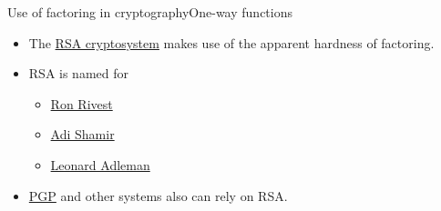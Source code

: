 \begin{frame}{Use of factoring in cryptography}{One-way functions}

\BigSkip{}%
\begin{itemize}
    \item<8-> The \href{https://en.wikipedia.org/wiki/RSA\_(cryptosystem)}{RSA  cryptosystem} makes use of the apparent hardness of factoring.
    \item<9-> RSA is named for
    \begin{itemize}
        \item \href{https://en.wikipedia.org/wiki/Ron\_Rivest}{Ron Rivest}
        \item \href{https://en.wikipedia.org/wiki/Adi\_Shamir}{Adi Shamir}
        \item \href{https://en.wikipedia.org/wiki/Leonard\_Adleman}{Leonard Adleman}
    \end{itemize}
    \item<10-> \href{https://en.wikipedia.org/wiki/Pretty_Good_Privacy}{PGP} and other systems also can rely on RSA.
\end{itemize}
\end{frame}

